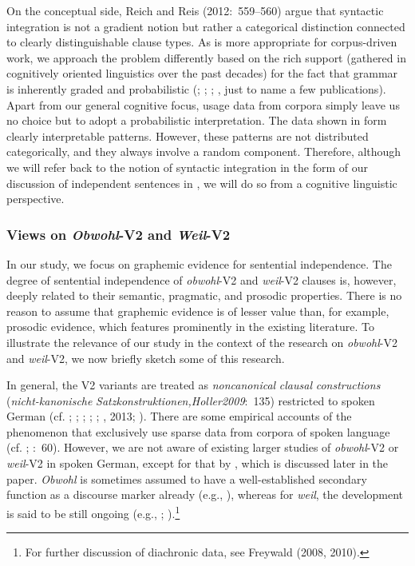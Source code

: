 On the conceptual side, Reich and Reis (2012:~559–560) argue that syntactic integration is not a gradient notion but rather a categorical distinction connected to clearly distinguishable clause types. As is more appropriate for corpus-driven work, we approach the problem differently based on the rich support (gathered in cognitively oriented linguistics over the past decades) for the fact that grammar is inherently graded and probabilistic (\citealt{Manning2003}; \citealt{HayBaayen2005}; \citealt{Bresnan2007}; \citealt{Kapatsinski2014}, just to name a few publications). Apart from our general cognitive focus, usage data from corpora simply leave us no choice but to adopt a probabilistic interpretation. The data shown in  form clearly interpretable patterns. However, these patterns are not distributed categorically, and they always involve a random component. Therefore, although we will refer back to the notion of syntactic integration in the form of our discussion of independent sentences in , we will do so from a cognitive linguistic perspective.



\subsubsection{Views on \textit{Obwohl}{}-V2 and \textit{Weil}{}-V2}



In our study, we focus on graphemic evidence for sentential independence. The degree of sentential independence of \textit{obwohl}{}-V2 and \textit{weil}{}-V2 clauses is, however, deeply related to their semantic, pragmatic, and prosodic properties. There is no reason to assume that graphemic evidence is of lesser value than, for example, prosodic evidence, which features prominently in the existing literature. To illustrate the relevance of our study in the context of the research on \textit{obwohl}{}-V2 and \textit{weil}{}-V2, we now briefly sketch some of this research.



In general, the V2 variants are treated as \textit{noncanonical} \textit{clausal} \textit{constructions} (\textit{nicht-kanonische} \textit{Satzkonstruktionen,Holler2009}:~135) restricted to spoken German (cf. \citealt{Gaumann1983}; \citealt{Günthner1993}; \citealt{Wegener2000}; \citealt{Pasch1997}; \citealt{Uhmann1998}; \citealt{AntomoSteinbach2010}, 2013; \citealt{Reis2013}). There are some empirical accounts of the phenomenon that exclusively use sparse data from corpora of spoken language (cf. \citealt{GohlGünthner1999}; \citealt{Freywald2010}:~60). However, we are not aware of ex\-isting larger studies of \textit{obwohl}{}-V2 or \textit{weil}{}-V2 in spoken Ger\-man, except for that by \citet{Volodina2011}, which is discussed later in the paper. \textit{Obwohl} is sometimes assumed to have a well-established secondary function as a discourse marker already (e.g., \citealt{Günthner2000}), whereas for \textit{weil}, the development is said to be still ongoing (e.g., \citealt{GohlGünthner1999}; \citealt{Günthner2003}).\footnote{For further discussion of diachronic data, see Freywald (2008, 2010).}



